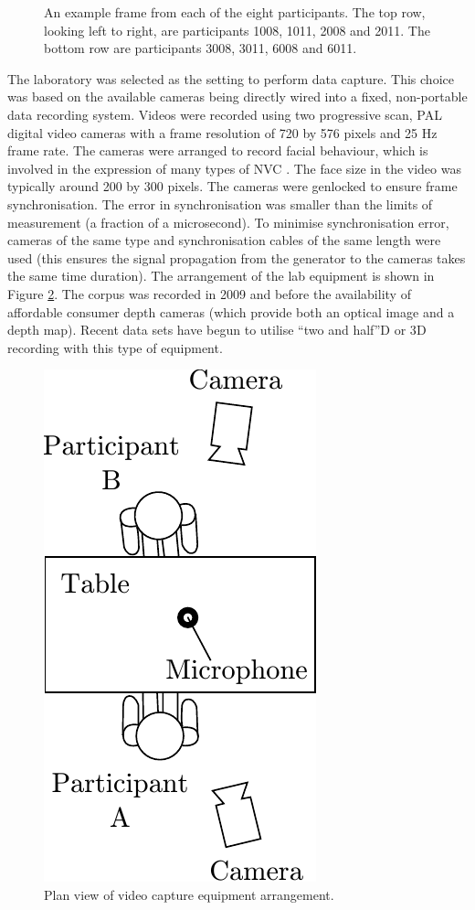 \begin{figure}
\caption[An example frame from each of the eight participants.]{An example frame from each of the eight participants. The top row, looking left to right, are participants 1008, 1011, 2008 and 2011. The bottom row are participants 3008, 3011, 6008 and 6011.}
\label{FigureExampleCorpusFrames}
\end{figure}

The laboratory was selected as the setting to perform data capture. This choice was based on the available cameras being directly wired into a fixed, non-portable data recording system. Videos were recorded using two progressive scan, PAL digital video cameras with a frame resolution of 720 by 576 pixels and 25 Hz frame rate. The cameras were arranged to record facial behaviour, which is involved in the expression of many types of \ac{NVC} \cite{Argyle1976} \cite{Morency2011}. The face size in the video was typically around 200 by 300 pixels. The cameras were genlocked to ensure frame synchronisation. The error in synchronisation was smaller than the limits of measurement (a fraction of a microsecond). To minimise synchronisation error, cameras of the same type and synchronisation cables of the same length were used (this ensures the signal propagation from the generator to the cameras takes the same time duration). The arrangement of the lab equipment is shown in Figure \ref{FigureVideoCaptureEquipment}. 
The corpus was recorded in 2009 and before the availability of affordable consumer depth cameras (which provide both an optical image and a depth map). Recent data sets have begun to utilise ``two and half''{D} or 3{D} recording \cite{Fanelli2010b} with this type of equipment.

\begin{figure}
\centering
\includegraphics[width = 0.30 \columnwidth]{corpus/VideoCapturePlan.pdf}
\caption{Plan view of video capture equipment arrangement.}
\label{FigureVideoCaptureEquipment}
\end{figure}

